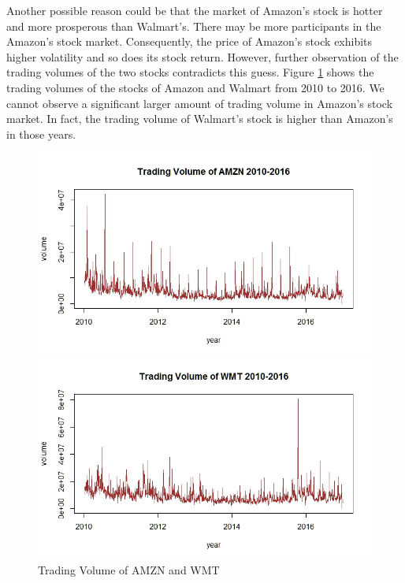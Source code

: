 \documentclass[paper=a4, fontsize=11pt]{article}
\begin{document}
Another possible reason could be that the market of Amazon's stock is hotter and more prosperous than Walmart's. There may be more participants in the Amazon's stock market. Consequently, the price of Amazon's stock exhibits higher volatility and so does its stock return. However, further observation of the trading volumes of the two stocks contradicts this guess. Figure \ref{volume} shows the trading volumes of the stocks of Amazon and Walmart from 2010 to 2016. We cannot observe a significant larger amount of trading volume in Amazon's stock market. In fact, the trading volume of Walmart's stock is higher than Amazon's in those years.

\begin{figure}[!htbp]
\begin{minipage}[!htbp]{0.5\linewidth}
\centering
\includegraphics[scale = 0.45]{img/volume_AMZN}
\end{minipage}
\begin{minipage}[!htbp]{0.5\linewidth}
\centering
\includegraphics[scale = 0.45]{img/volume_WMT}
\end{minipage}
\caption{Trading Volume of AMZN and WMT}
\label{volume}
\end{figure}
\end{document}
